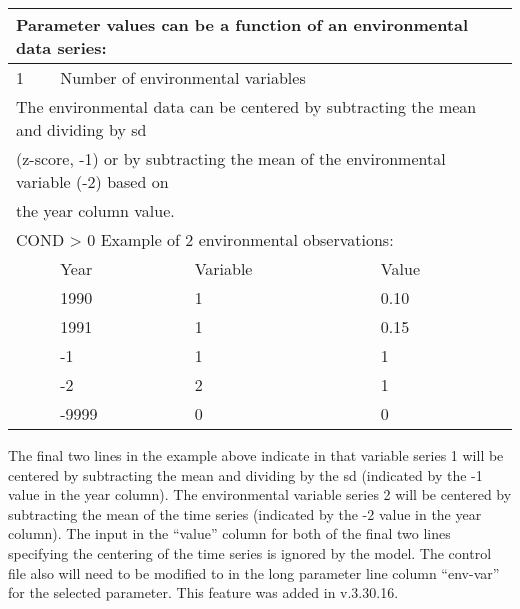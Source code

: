 \begin{center}
	\vspace*{-\baselineskip}
	\begin{tabular}{p{1cm} p{2cm} p{2cm} p{1cm}}
		\multicolumn{4}{l}{Parameter values can be a function of an environmental data series:} \\
		\hline
		1 & \multicolumn{3}{l}{Number of environmental variables} \Tstrut\Bstrut\\
		\multicolumn{4}{l}{The environmental data can be centered by subtracting the mean and dividing by \gls{sd}} \\
		\multicolumn{4}{l}{(z-score, -1) or by subtracting the mean of the environmental variable (-2) based on} \\
		\multicolumn{4}{l}{the year column value.} \\
		\hline
		\multicolumn{4}{l}{COND > 0  Example of 2 environmental observations:} \Tstrut\\
		  & Year & Variable & Value \Bstrut\\
		\hline
		  & 1990 & 1 & 0.10 \Tstrut\\
		  & 1991 & 1 & 0.15 \\
		  & -1   & 1 & 1 \\
		  & -2   & 2 & 1 \\
		  & -9999 & 0 & 0 \Bstrut\\
		\hline
	\end{tabular}
\end{center}

The final two lines in the example above indicate in that variable series 1 will be centered by subtracting the mean and dividing by the \gls{sd} (indicated by the -1 value in the year column). The environmental variable series 2 will be centered by subtracting the mean of the time series (indicated by the -2 value in the year column). The input in the ``value'' column for both of the final two lines specifying the centering of the time series is ignored by the model. The control file also will need to be modified to in the long parameter line column ``env-var'' for the selected parameter. This feature was added in v.3.30.16.


